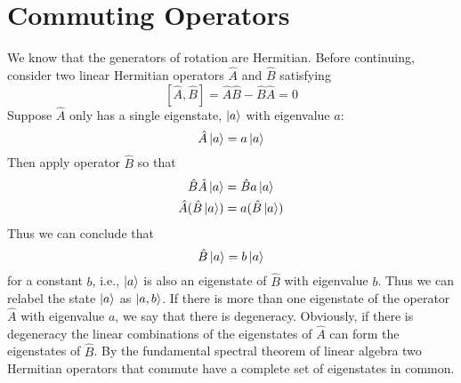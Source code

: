 \documentclass{report}
\begin{document}
\section{Commuting Operators}
We know that the generators of rotation are Hermitian. Before continuing, consider two linear Hermitian operators \(\hat A\) and \(\hat B\) satisfying \[
[\hat A , \hat B] = \hat A \hat B - \hat B \hat A = 0
\] 
Suppose \(\hat A\) only has a single eigenstate, \(\ket{a}\) with eigenvalue \(a\):
\[
\hat A \ket{a} = a \ket{a}
\] 
Then apply operator \(\hat B\) so that 
\begin{align*}
	\hat B \hat A \ket a &= \hat B a \ket a \\
	\hat A (\hat B \ket a )&= a( \hat B \ket a)
\end{align*}
Thus we can conclude that 
\[
\hat B \ket a = b \ket a
\] 
for a constant \(b\), i.e., \(\ket a\) is also an eigenstate of \(\hat B\) with eigenvalue \(b\). Thus we can relabel the state \(\ket a\) as \(\ket{a, b}\). If there is more than one eigenstate of the operator \(\hat A\) with eigenvalue \(a\), we say that there is degeneracy. Obviously, if there is degeneracy the linear combinations of the eigenstates of \(\hat A\) can form the eigenstates of \(\hat B\). By the fundamental spectral theorem of linear algebra two Hermitian operators that commute have a complete set of eigenstates in common. 
\end{document}

